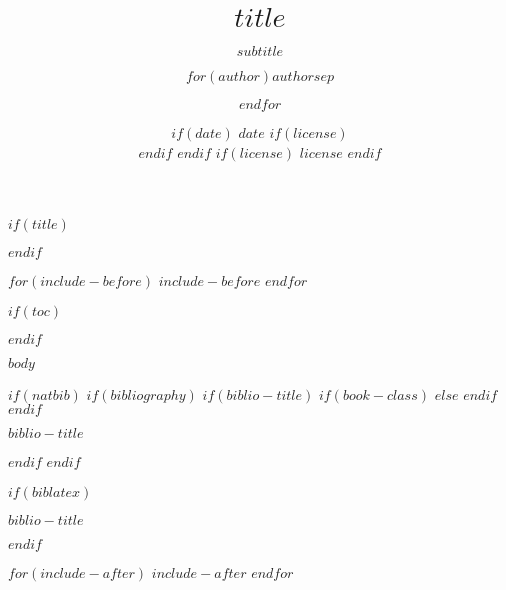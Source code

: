\documentclass[$if(fontsize)$$fontsize$,$endif$$if(lang)$$babel-lang$,$endif$$if(handout)$handout,$endif$$if(colorlinks)$dvipsnames,$endif$$if(beamer)$ignorenonframetext,$endif$$for(classoption)$$classoption$$sep$,$endfor$]{$documentclass$}
\title{\insertsectionhead}
  {
    \definecolor{white}{rgb}{0.776,0.357,0.157}
    \definecolor{iqss@orange}{rgb}{1,1,1}
    \ifnum \insertmainframenumber > \insertframenumber
    \frame{
      \frametitle{\iqsssectiontitleheader}
      \tableofcontents[currentsection]
    }
    \else
    \frame{
      \frametitle{Backup Slides}
      \tableofcontents[sectionstyle=shaded/shaded,subsectionstyle=shaded/shaded/shaded]
    }
    \fi
  }
\title[$shorttitle$]{$title$}
\subtitle{$subtitle$}
\author[
    $if(short-author)$
    $for(short-author)$$short-author$$sep$ \and $endfor$
  $else$
    $for(author)$$author$$sep$ \and $endfor$
  $endif$
  ]{$for(author)$$author$$sep$ \and $endfor$}
\institute[
  $if(short-institute)$
    $for(short-institute)$$short-institute$$sep$ \and $endfor$
  $endif$
  ]{
  $if(department)$
    $for(department)$$department$$sep$ \and $endfor$ \\
  $endif$
  $for(institute)$$institute$$sep$ \and $endfor$
  $if(email)$
    \\ $for(email)$ \href{mailto:$email$}{\nolinkurl{$email$}}$sep$ \and $endfor$
  $endif$
  }
\date[
  $if(short-date)$
    $short-date$
  $else$
    $date$
  $endif$]{
  $if(date)$
    $date$
    $if(license)$
      \\ \vspace{5mm}
    $endif$
  $endif$
  $if(license)$
    {\scriptsize $license$}
  $endif$
}
\newif\ifbibliography
\begin{document}
$if(title)$
  \begin{frame}[plain]
  \titlepage
  \end{frame}
$endif$

$for(include-before)$
  $include-before$
$endfor$

$if(toc)$
  \begin{frame}
  \tableofcontents[hideallsubsections]
  \end{frame}
$endif$

$body$

$if(natbib)$
  $if(bibliography)$
    $if(biblio-title)$
      $if(book-class)$
        \renewcommand\bibname{$biblio-title$}
        $else$
        \renewcommand\refname{$biblio-title$}
      $endif$
    $endif$
    \begin{frame}[allowframebreaks]{$biblio-title$}
    \bibliographytrue
    
    \end{frame}
  $endif$
$endif$

$if(biblatex)$
  \begin{frame}[allowframebreaks]{$biblio-title$}
  \bibliographytrue
  \printbibliography[heading=none]
  \end{frame}
$endif$

$for(include-after)$
  $include-after$
$endfor$
\end{document}
